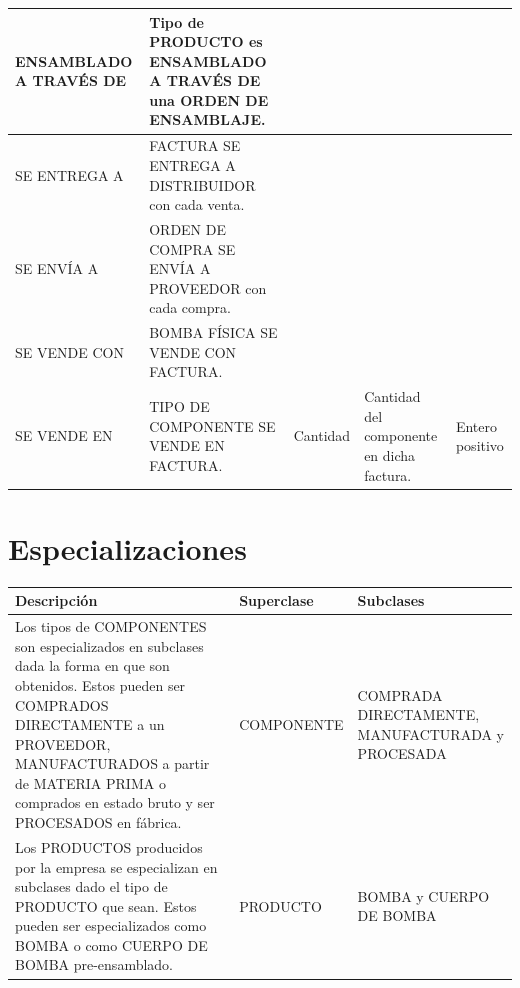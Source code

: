 \documentclass[]{report}
\begin{document}
	\begin{center}
		\begin{tabular}{ | p{2.5cm} | p{5cm} | p{2cm} | p{4.5cm} | p{3cm}|}
			\hline
			
			ENSAMBLADO A TRAVÉS DE & Tipo de PRODUCTO es ENSAMBLADO A TRAVÉS DE una ORDEN DE ENSAMBLAJE. &  &  & \\ \cline{3-5}
			\hline
			
			SE ENTREGA A & FACTURA SE ENTREGA A DISTRIBUIDOR con cada venta. &  &  & \\ \cline{3-5}
			\hline
			
			SE ENVÍA A & ORDEN DE COMPRA SE ENVÍA A PROVEEDOR con cada compra. &  &  & \\ \cline{3-5}
			\hline
			
			SE VENDE CON & BOMBA FÍSICA SE VENDE CON FACTURA. & &  & \\ 
			\hline
			
			SE VENDE EN & TIPO DE COMPONENTE SE VENDE EN FACTURA. &
			Cantidad & Cantidad del componente en dicha factura. & Entero positivo\\ \cline{3-5}
			\hline
			
		\end{tabular}
	\end{center}
	
	
	\section*{\centering Especializaciones}
	\begin{center}
		\begin{tabular}{ | p{10cm} | p{3.5cm} | p{3.5cm}|}
			\hline
		
			Descripción & Superclase & Subclases \\
			\hline
		
			Los tipos de COMPONENTES son especializados en subclases dada la forma en que son
			obtenidos. Estos pueden ser COMPRADOS DIRECTAMENTE a un PROVEEDOR, MANUFACTURADOS 
			a partir de MATERIA PRIMA o comprados en estado bruto y ser PROCESADOS en fábrica. & 			COMPONENTE & COMPRADA DIRECTAMENTE, MANUFACTURADA y PROCESADA\\
			\hline
			
			Los PRODUCTOS producidos por la empresa se especializan en subclases dado el tipo de 				PRODUCTO que sean. Estos pueden ser especializados como BOMBA o como CUERPO DE BOMBA
			pre-ensamblado. & PRODUCTO & BOMBA y CUERPO DE BOMBA\\
			\hline
			
		\end{tabular}
	\end{center}
	
\end{document}
